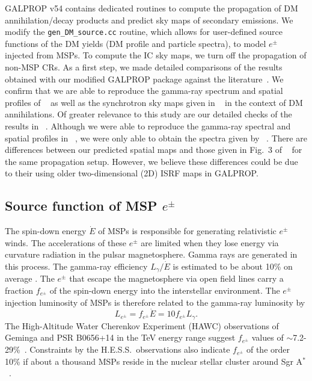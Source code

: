 \documentclass[doublespace,nopageskip]{VTthesis} %
\begin{document}
GALPROP v54 contains dedicated routines to compute the propagation of DM annihilation/decay products and predict sky maps of secondary emissions. We modify the \texttt{gen\_DM\_source.cc} routine, which allows for user-defined source functions of the DM yields (DM profile and particle spectra), to model  $e^\pm$ injected from MSPs. To compute the IC sky maps, we turn off the propagation of non-MSP CRs. As a first step, we made detailed comparisons of the results obtained with our modified GALPROP package against the literature~\cite{2014JCAP...12..045C,2016JCAP...07..041C,2015ApJ...802..124Y,2015JCAP...02..023P}. We confirm that we are able to reproduce the gamma-ray spectrum and spatial profiles of ~\citet{2014JCAP...12..045C} as well as the synchrotron sky maps given in ~\citet{2016JCAP...07..041C} in the context of DM annihilations. Of greater relevance to this study are our detailed checks of the results in ~\citet{2015ApJ...802..124Y, 2015JCAP...02..023P}. Although we were able to reproduce the gamma-ray spectral and spatial profiles in ~\citet{2015JCAP...02..023P}, we were only able to obtain the spectra given by ~\citet{2015ApJ...802..124Y}. There are differences between our predicted spatial maps and those given in Fig.~3 of ~\citet{2015ApJ...802..124Y} for the same propagation setup. However, we believe these differences could be due to their using older two-dimensional (2D) ISRF maps in GALPROP.

\subsection{Source function of MSP \texorpdfstring{$e^\pm$}{electrons/positrons}}\label{sec:source}

The spin-down energy $\dot E$ of MSPs is responsible for generating relativistic $e^\pm$ winds. The accelerations of these $e^\pm$ are limited when they lose energy via curvature radiation in the pulsar magnetosphere. Gamma rays are generated in this process. The gamma-ray efficiency $L_\gamma/\dot E$ is estimated to be about 10\% on average \cite{2013ApJS..208...17A}. The $e^\pm$ that escape the magnetosphere via open field lines carry a fraction $f_{e^\pm}$ of the spin-down energy into the interstellar environment. The $e^\pm$ injection luminosity of MSPs is therefore related to the gamma-ray luminosity by
\begin{equation}\label{eq:Le}
  L_{e^\pm}=f_{e^\pm}\dot{E}=10f_{e^\pm}L_\gamma.
\end{equation}
The High-Altitude Water Cherenkov Experiment (HAWC) observations of Geminga and PSR B0656+14 in the TeV energy range suggest $f_{e^\pm}$ values of $\sim$7.2-29\%~\cite{2017PhRvD..96j3013H}. Constraints by the H.E.S.S.~observations also indicate $f_{e^\pm}$ of the order 10\% if about a thousand MSPs reside in the nuclear stellar cluster around Sgr A$^*$~\cite{2013MNRAS.435L..14B}.
\end{document}

